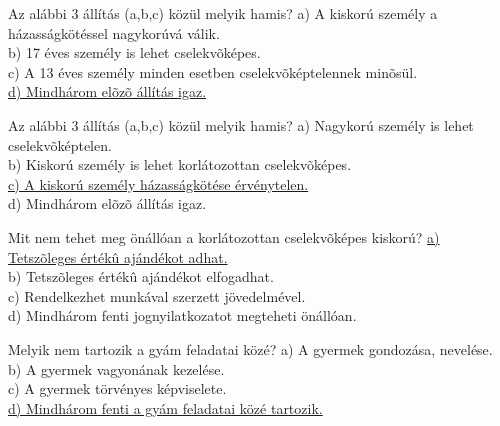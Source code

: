 \begin{frame}

\begin{tcolorbox}[title={44. Kérdés}]
Az alábbi 3 állítás (a,b,c) közül melyik hamis?
\tcblower
a) A kiskorú személy a házasságkötéssel nagykorúvá válik.\\
b) 17 éves személy is lehet cselekvõképes.\\
c) A 13 éves személy minden esetben cselekvõképtelennek minõsül.\\
\uline {d) Mindhárom elõzõ állítás igaz.}
\end{tcolorbox}

\begin{tcolorbox}[title={45. Kérdés}]
Az alábbi 3 állítás (a,b,c) közül melyik hamis?
\tcblower
a) Nagykorú személy is lehet cselekvõképtelen.\\
b) Kiskorú személy is lehet korlátozottan cselekvõképes.\\
\uline {c) A kiskorú személy házasságkötése érvénytelen.}\\
d) Mindhárom elõzõ állítás igaz.
\end{tcolorbox}

\begin{tcolorbox}[title={46. Kérdés}]
Mit nem tehet meg önállóan a korlátozottan cselekvõképes kiskorú?
\tcblower
\uline {a) Tetszõleges értékû ajándékot adhat.}\\
b) Tetszõleges értékû ajándékot elfogadhat.\\
c) Rendelkezhet munkával szerzett jövedelmével.\\
d) Mindhárom fenti jognyilatkozatot megteheti önállóan.
\end{tcolorbox}

\begin{tcolorbox}[title={47. Kérdés}]
Melyik nem tartozik a gyám feladatai közé?
\tcblower
a) A gyermek gondozása, nevelése.\\
b) A gyermek vagyonának kezelése.\\
c) A gyermek törvényes képviselete.\\
\uline {d) Mindhárom fenti a gyám feladatai közé tartozik.}
\end{tcolorbox}

\end{frame}


